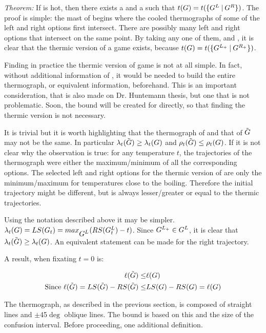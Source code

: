 \textit{Theorem:} If \Gm{} is hot, then there exists a  and a  such that $t(G) = t(\mbox{$\{\mbox{$G^L$}\:|\:\mbox{$G^R$}\}$})$. The proof is simple: the mast of \Gm{} begins where the cooled thermographs of some of the left and right options first intersect. There are possibly many left and right options that intersect on the same point. By taking any one of them,  and , it is clear that the thermic version of a game exists, because $t(G) = t(\mbox{$\{\mbox{$G^{L_+}$}\:|\:\mbox{$G^{R_+}$}\}$})$.

Finding in practice the thermic version of game is not at all simple. In fact, without additional information of \Gm{}, it would be needed to build the entire thermograph, or equivalent information, beforehand. This is an important consideration, that is also made on Dr. Huntemann thesis, but one that is not problematic. Soon, the bound will be created for \Gm{} directly, so that finding the thermic version is not necessary.

It is trivial but it is worth highlighting that the thermograph of \Gm{} and that of $\tilde{\mbox{$G$}}$ may not be the same. In particular $\lambda_t(\tilde{\mbox{$G$}}) \ge \lambda_t(\mbox{$G$})$ and $\rho_t(\tilde{\mbox{$G$}}) \leq \rho_t(\mbox{$G$})$. If it is not clear why the observation is true: for any temperature $t$, the trajectories of the thermograph were either the maximum/minimum of all the corresponding options. The selected left and right options for the thermic version of \Gm{} are only the minimum/maximum for temperatures close to the boiling. Therefore the initial trajectory might be different, but is always lesser/greater or equal to the thermic trajectories.

Using the notation described above it may be simpler. $\lambda_t(\mbox{$G$}) = LS(\mbox{$G_t$}) = max_{\mbox{$G^L$}}(RS(\mbox{$G^L_t$}) - t)$. Since $\mbox{$G^{L_+}$} \in \mbox{$G^L$}$, it is clear that $\lambda_t(\tilde{\mbox{$G$}}) \ge \lambda_t(\mbox{$G$})$. An equivalent statement can be made for the right trajectory.

A result, when fixating $t=0$ is:

\begin{align*}
\ell(\tilde{\mbox{$G$}}) \leq& \ell(\mbox{$G$})\\
\text{Since } \ell(\tilde{\mbox{$G$}}) = LS(\tilde{\mbox{$G$}}) - RS(\tilde{\mbox{$G$}})\leq& LS(\mbox{$G$}) - RS(\mbox{$G$}) = \ell(\mbox{$G$})
\end{align*}

The thermograph, as described in the previous section, is composed of straight lines and $\pm$45$\deg$ oblique lines. The bound is based on this and the size of the confusion interval. Before proceeding, one additional definition.


